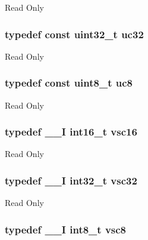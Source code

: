 Read Only \hypertarget{group___exported__types_ga5b628e6a05856ff67e535fa391a57683}{
\subsubsection[{uc32}]{\setlength{\rightskip}{0pt plus 5cm}typedef const uint32\-\_\-t {\bf uc32}}}\label{group___exported__types_ga5b628e6a05856ff67e535fa391a57683}
Read Only \hypertarget{group___exported__types_gac74022c74a461f810e0d4fdc9bfea480}{
\subsubsection[{uc8}]{\setlength{\rightskip}{0pt plus 5cm}typedef const uint8\-\_\-t {\bf uc8}}}\label{group___exported__types_gac74022c74a461f810e0d4fdc9bfea480}
Read Only \hypertarget{group___exported__types_ga369ae0177b957e5afa7c1e62312f97c3}{
\subsubsection[{vsc16}]{\setlength{\rightskip}{0pt plus 5cm}typedef \-\_\-\-\_\-\-I int16\-\_\-t {\bf vsc16}}}\label{group___exported__types_ga369ae0177b957e5afa7c1e62312f97c3}
Read Only \hypertarget{group___exported__types_gaec1d22666cf030b79051e5daa372fbc8}{
\subsubsection[{vsc32}]{\setlength{\rightskip}{0pt plus 5cm}typedef \-\_\-\-\_\-\-I int32\-\_\-t {\bf vsc32}}}\label{group___exported__types_gaec1d22666cf030b79051e5daa372fbc8}
Read Only \hypertarget{group___exported__types_ga47463bcded079ac61d5da46aff497803}{
\subsubsection[{vsc8}]{\setlength{\rightskip}{0pt plus 5cm}typedef \-\_\-\-\_\-\-I int8\-\_\-t {\bf vsc8}}}\label{group___exported__types_ga47463bcded079ac61d5da46aff497803}
